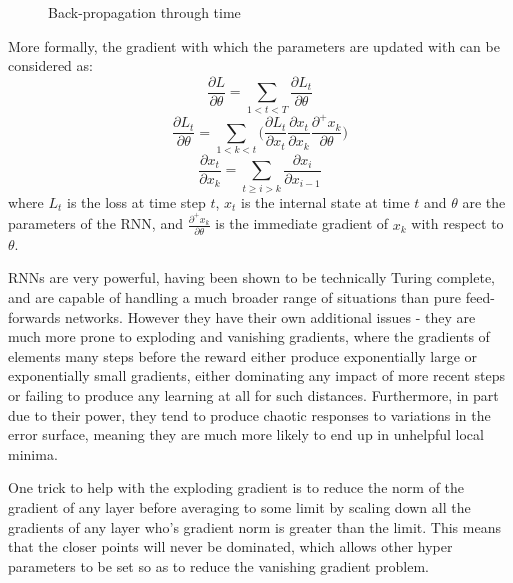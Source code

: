\begin{figure}
\centering

\caption{Back-propagation through time}
\label{fig:bptt}
\end{figure}
More formally, the gradient with which the parameters are updated with can be considered as:
\begin{equation}
\frac{\partial L}{\partial \theta} = \sum_{1<t<T}\frac{\partial L_t}{\partial\theta}
\end{equation}
\begin{equation}
\frac{\partial L_t}{\partial\theta} = \sum_{1 < k< t} \big( \frac{\partial L_t}{\partial x_t}\frac{\partial x_t}{\partial x_k} \frac{\partial^+ x_k}{\partial\theta} \big)
\end{equation}
\begin{equation}
\frac{\partial x_t}{\partial x_k} =\sum_{t \geq i > k} \frac{\partial x_i}{\partial x_{i-1}} 
\end{equation}
 where $L_t$ is the loss at time step $t$, $x_t$ is the internal state at time $t$ and $\theta$ are the parameters of the RNN, and $\frac{\partial^+ x_k}{\partial\theta}$ is the immediate gradient of $x_k$ with respect to $\theta$. \cite{pascanu13} %
 
RNNs are very powerful, having been shown to be technically Turing complete, and are capable of handling a much broader range of situations than pure feed-forwards networks. However they have their own additional issues - they are much more prone to exploding and vanishing gradients, where the gradients of elements many steps before the reward either produce exponentially large or exponentially small gradients, either dominating any impact of more recent steps or failing to produce any learning at all for such distances. Furthermore, in part due to their power, they tend to produce chaotic responses to variations in the error surface, meaning they are much more likely to end up in unhelpful local minima.

One trick to help with the exploding gradient is to reduce the norm of the gradient of any layer before averaging to some limit by scaling down all the gradients of any layer who's gradient  norm is greater than the limit. This means that the closer points will never be dominated, which allows other hyper parameters to be set so as to reduce the vanishing gradient problem.

